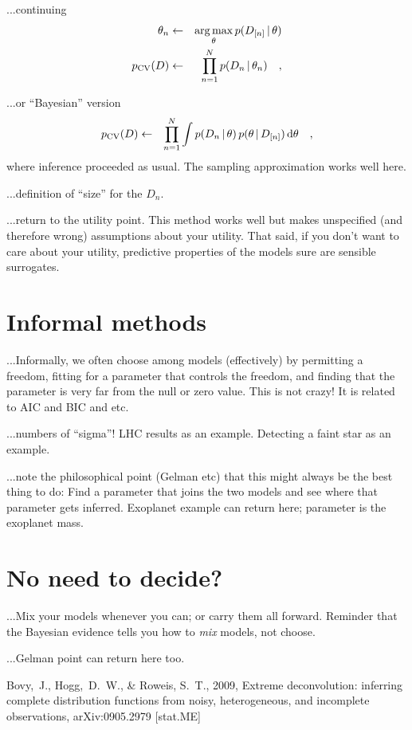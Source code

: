 \documentclass[12pt,twoside]{article}
\newcommand{\data}{D}
\newcommand{\pars}{\theta}
\newcommand{\cv}{\mathrm{CV}}
\newcommand{\pcv}{p_{\cv}}
\begin{document}
...continuing
\begin{eqnarray}
\pars_n &\leftarrow& \argmax_\pars p(\data_{[n]}\given\pars)
\\
\pcv(\data) &\leftarrow& \prod_{n=1}^N p(\data_n\given\pars_n)
\quad,
\end{eqnarray}

...or ``Bayesian'' version
\begin{eqnarray}
\pcv(\data) &\leftarrow& \prod_{n=1}^N \int p(\data_n\given\pars)\,p(\pars\given\data_{[n]})\,\dd\pars
\quad,
\end{eqnarray}
where inference proceeded as usual.  The sampling approximation works well here.

...definition of ``size'' for the $\data_n$.

...return to the utility point.  This method works well but makes
unspecified (and therefore wrong) assumptions about your utility.
That said, if you don't want to care about your utility, predictive
properties of the models sure are sensible surrogates.

\section{Informal methods} %

...Informally, we often choose among models (effectively) by
permitting a freedom, fitting for a parameter that controls the
freedom, and finding that the parameter is very far from the null or
zero value.  This is not crazy!  It is related to AIC and BIC and etc.

...numbers of ``sigma''!  LHC results as an example.  Detecting a
faint star as an example.

...note the philosophical point (Gelman etc) that this might always be
the best thing to do: Find a parameter that joins the two models and
see where that parameter gets inferred.  Exoplanet example can return
here; parameter is the exoplanet mass.

\section{No need to decide?}

...Mix your models whenever you can; or carry them all forward.  Reminder
that the Bayesian evidence tells you how to \emph{mix} models, not
choose.

...Gelman point can return here too.

\clearpage
{}\theendnotes

\clearpage
\begin{thebibliography}{}
  Bovy,~J., Hogg,~D.~W., \& Roweis, S.~T., 2009,
  Extreme deconvolution: inferring complete distribution functions from noisy, heterogeneous, and incomplete observations, 
  arXiv:0905.2979 [stat.ME]
\end{thebibliography}
\end{document}
